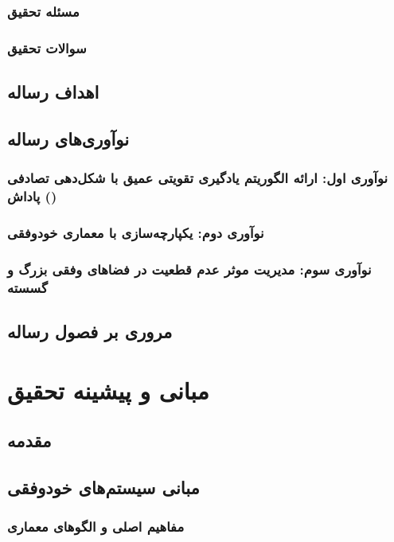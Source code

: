 \documentclass[oneside,openany,phd]{TMU-Thesis}
\begin{document}
\subsection{مسئله تحقیق}
\subsection{سوالات تحقیق}

\section{اهداف رساله}

\section{نوآوری‌های رساله}
\subsection{نوآوری اول: ارائه الگوریتم یادگیری تقویتی عمیق با شکل‌دهی تصادفی پاداش ()}
\subsection{نوآوری دوم: یکپارچه‌سازی  با معماری خودوفقی }
\subsection{نوآوری سوم: مدیریت موثر عدم قطعیت در فضاهای وفقی بزرگ و گسسته}

\section{مروری بر فصول رساله}

\newpage

\chapter{مبانی و پیشینه تحقیق}
\section{مقدمه}

\section{مبانی سیستم‌های خودوفقی}
\subsection{مفاهیم اصلی و الگوهای معماری}
\end{document}
